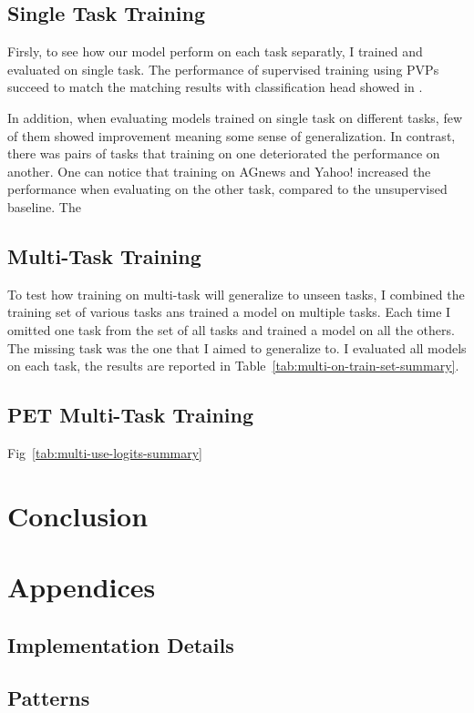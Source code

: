 \documentclass[11pt,a4paper]{article}
\begin{document}
\subsection{Single Task Training}
Firsly, to see how our model perform on each task separatly, I trained and evaluated on single task.
The performance of supervised training using PVPs succeed to match the matching results with classification head showed in \citet{schick2020exploiting}.

In addition, when evaluating models trained on single task on different tasks, few of them showed improvement meaning some sense of generalization.
In contrast, there was pairs of tasks that training on one deteriorated the performance on another.
One can notice that training on AGnews and Yahoo! increased the performance when evaluating on the other task, compared to the unsupervised baseline.
The 

\subsection{Multi-Task Training}



To test how training on multi-task will generalize to unseen tasks, I combined the training set of various tasks ans trained a model on multiple tasks.
Each time I omitted one task from the set of all tasks and trained a model on all the others.
The missing task was the one that I aimed to generalize to.
I evaluated all models on each task, the results are reported in Table~\ref{tab:multi-on-train-set-summary}.


\subsection{PET Multi-Task Training}
Fig~\ref{tab:multi-use-logits-summary}





\section{Conclusion}





\newpage
\appendix

\section{Appendices}
\label{sec:appendix}

\subsection{Implementation Details}

\subsection{Patterns}
\label{apx:patterns}




\end{document}
